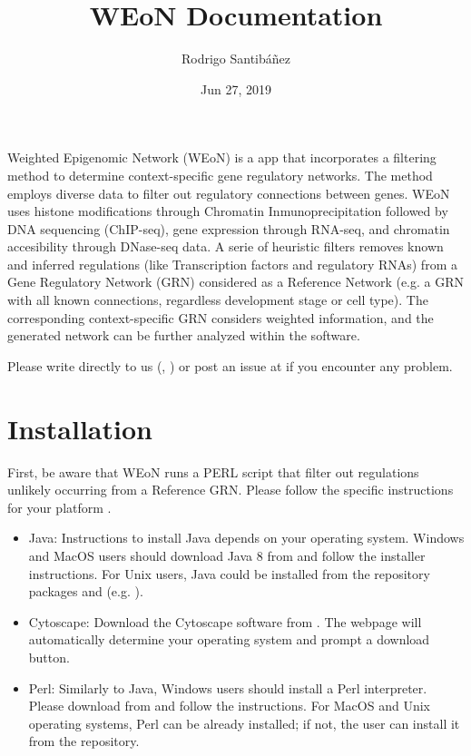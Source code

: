 \documentclass[letterpaper,10pt,english]{sphinxmanual}
\title{WEoN Documentation}
\date{Jun 27, 2019}
\author{Rodrigo Santibáñez}
\begin{document}
\pagestyle{empty}
\sphinxmaketitle
\pagestyle{plain}
\sphinxtableofcontents
\pagestyle{normal}
\label{\detokenize{index::doc}}


Weighted Epigenomic Network (WEoN) is a  app that incorporates a filtering method to determine context-specific gene regulatory networks. The method employs diverse data to filter out regulatory connections between genes. WEoN uses histone modifications through Chromatin Inmunoprecipitation followed by DNA sequencing (ChIP-seq), gene expression through RNA-seq, and chromatin accesibility through DNase-seq data. A serie of heuristic filters removes known and inferred regulations (like Transcription factors and regulatory RNAs) from a Gene Regulatory Network (GRN) considered as a Reference Network (e.g. a GRN with all known connections, regardless development stage or cell type). The corresponding context-specific GRN considers weighted information, and the generated network can be further analyzed within the  software.

Please write directly to us (, ) or post an issue at  if you encounter any problem.


\chapter{Installation}
\label{\detokenize{installation:installation}}\label{\detokenize{installation::doc}}
First, be aware that WEoN runs a PERL script that filter out regulations unlikely occurring from a Reference GRN. Please follow the specific instructions for your platform .

\begin{itemize}
\item {} 
Java: Instructions to install Java depends on your operating system. Windows and MacOS users should download Java 8 from  and follow the installer instructions. For Unix users, Java could be installed from the repository packages  and  (e.g. ).

\item {} 
Cytoscape: Download the Cytoscape software from . The webpage will automatically determine your operating system and prompt a download button.

\item {} 
Perl: Similarly to Java, Windows users should install a Perl interpreter. Please download from  and follow the instructions. For MacOS and Unix operating systems, Perl can be already installed; if not, the user can install it from the repository.

\end{itemize}
\end{document}
